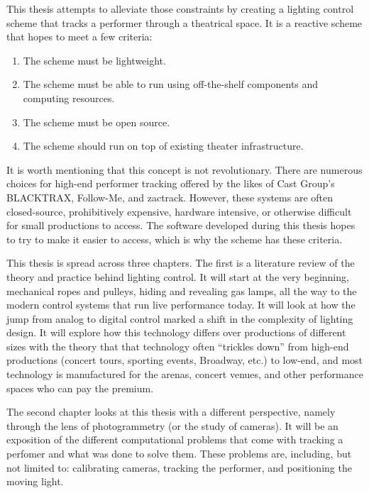 \documentclass[
    12pt,
    twoside,
    bibstyle=chicago,
    headerstyle=uppercase,
	bibfile=biblatex_updating.bib
]{reedthesis}
\begin{document}
This thesis attempts to alleviate those constraints by creating a lighting control scheme that tracks a performer through a theatrical space. It is a reactive scheme that hopes to meet a few criteria: 
\begin{enumerate}
	\item The scheme must be lightweight.
	\item The scheme must be able to run using off-the-shelf components and computing resources.
	\item The scheme must be open source.
	\item The scheme should run on top of existing theater infrastructure.
\end{enumerate}It is worth mentioning that this concept is not revolutionary. There are numerous choices for high-end performer tracking offered by the likes of Cast Group's BLACKTRAX, Follow-Me, and zactrack. However, these systems are often closed-source, prohibitively expensive, hardware intensive, or otherwise difficult for small productions to access. The software developed during this thesis hopes to try to make it easier to access, which is why the scheme has these criteria. 
    
This thesis is spread across three chapters. The first is a literature review of the theory and practice behind lighting control. It will start at the very beginning, mechanical ropes and pulleys, hiding and revealing gas lamps, all the way to the modern control systems that run live performance today. It will look at how the jump from analog to digital control marked a shift in the complexity of lighting design. It will explore how this technology differs over productions of different sizes with the theory that that technology often “trickles down” from high-end productions (concert tours, sporting events, Broadway, etc.) to low-end, and most technology is manufactured for the arenas, concert venues, and other performance spaces who can pay the premium.
    
    
    The second chapter looks at this thesis with a different perspective, namely through the lens of photogrammetry (or the study of cameras). It will be an exposition of the different computational problems that come with tracking a perfomer and what was done to solve them. These problems are, including, but not limited to: calibrating cameras, tracking the performer, and positioning the moving light.
    
\end{document}
